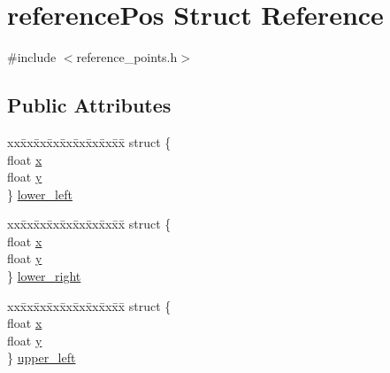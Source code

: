\hypertarget{structreference_pos}{\section{reference\+Pos Struct Reference}
\label{structreference_pos}
}


{\ttfamily \#include $<$reference\+\_\+points.\+h$>$}

\subsection*{Public Attributes}
\begin{DoxyCompactItemize}
\item 
\begin{tabbing}
xx\=xx\=xx\=xx\=xx\=xx\=xx\=xx\=xx\=\kill
struct \{\\
\>float \hyperlink{structreference_pos_a515603c98b53f93684950b9343f0e80f}{x}\\
\>float \hyperlink{structreference_pos_ae4599fc96bf90c0748eaea09f64bc304}{y}\\
\} \hyperlink{structreference_pos_a324fd9502d9f404bf46fede46456b268}{lower\_left}\\

\end{tabbing}\item 
\begin{tabbing}
xx\=xx\=xx\=xx\=xx\=xx\=xx\=xx\=xx\=\kill
struct \{\\
\>float \hyperlink{structreference_pos_a515603c98b53f93684950b9343f0e80f}{x}\\
\>float \hyperlink{structreference_pos_ae4599fc96bf90c0748eaea09f64bc304}{y}\\
\} \hyperlink{structreference_pos_a5ddb288dbf9837363cceaa96784dafcc}{lower\_right}\\

\end{tabbing}\item 
\begin{tabbing}
xx\=xx\=xx\=xx\=xx\=xx\=xx\=xx\=xx\=\kill
struct \{\\
\>float \hyperlink{structreference_pos_a515603c98b53f93684950b9343f0e80f}{x}\\
\>float \hyperlink{structreference_pos_ae4599fc96bf90c0748eaea09f64bc304}{y}\\
\} \hyperlink{structreference_pos_a4861a988f406fc832e3bacde234aa8fb}{upper\_left}\\


\end{tabbing}
\end{DoxyCompactItemize}
